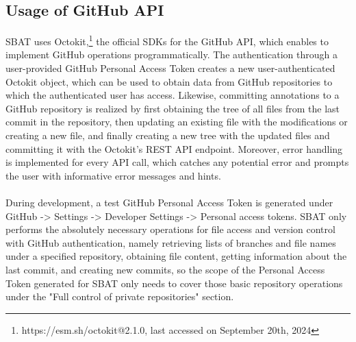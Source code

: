 \documentclass[12ptm a4paper]{article}
\begin{document}
\subsection{Usage of GitHub API}
SBAT uses Octokit,\footnote{https://esm.sh/octokit@2.1.0, last accessed on September 20th, 2024} the official SDKs for the GitHub API, which enables to implement GitHub operations programmatically. The authentication through a user-provided GitHub Personal Access Token creates a new user-authenticated Octokit object, which can be used to obtain data from GitHub repositories to which the authenticated user has access. Likewise, committing annotations to a GitHub repository is realized by first obtaining the tree of all files from the last commit in the repository, then updating an existing file with the modifications or creating a new file, and finally creating a new tree with the updated files and committing it with the Octokit's REST API endpoint. Moreover, error handling is implemented for every API call, which catches any potential error and prompts the user with informative error messages and hints.\\
\\
During development, a test GitHub Personal Access Token is generated under GitHub -> Settings -> Developer Settings -> Personal access tokens. SBAT only performs the absolutely necessary operations for file access and version control with GitHub authentication, namely retrieving lists of branches and file names under a specified repository, obtaining file content, getting information about the last commit, and creating new commits, so the scope of the Personal Access Token generated for SBAT only needs to cover those basic repository operations under the "Full control of private repositories" section.
\newpage
\end{document}
